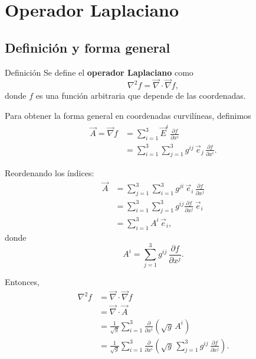 \documentclass[../apunte_mecanica_clasica.tex]{subfiles}%
\begin{document}
\section{Operador Laplaciano}


\subsection{Definición y forma general}

\begin{apuntebloque}{Definición}
Se define el \textbf{operador Laplaciano} como
\begin{equation*}
    \nabla^2 f = \vec{\nabla}\cdot \vec{\nabla} f,
\end{equation*}
donde $f$ es una función arbitraria que depende de las coordenadas.
\end{apuntebloque}

Para obtener la forma general en coordenadas curvilíneas, definimos
\begin{align*}
    \vec{A} = \vec{\nabla} f
    &= \sum_{i=1}^3 \vec{E}^i \,\frac{\partial f}{\partial x^i} \\[6pt]
    &= \sum_{i=1}^3 \sum_{j=1}^3 g^{ij}\,\vec{e}_j \,\frac{\partial f}{\partial x^i}.
\end{align*}

Reordenando los índices:
\begin{align*}
    \vec{A} 
    &= \sum_{j=1}^3 \sum_{i=1}^3 g^{ji}\,\vec{e}_i \,\frac{\partial f}{\partial x^j} \\[6pt]
    &= \sum_{i=1}^3 \sum_{j=1}^3 g^{ij} \frac{\partial f}{\partial x^j}\,\vec{e}_i \\[6pt]
    &= \sum_{i=1}^3 A^i \,\vec{e}_i,
\end{align*}
donde
\begin{equation*}
    A^i = \sum_{j=1}^3 g^{ij}\,\frac{\partial f}{\partial x^j}.
\end{equation*}

Entonces,
\begin{align*}
    \nabla^2 f 
    &= \vec{\nabla}\cdot \vec{\nabla} f \\[6pt]
    &= \vec{\nabla}\cdot \vec{A} \\[6pt]
    &= \frac{1}{\sqrt{g}} \sum_{i=1}^3 \frac{\partial}{\partial x^i} 
       \left(\sqrt{g}\, A^i\right) \\[6pt]
    &= \frac{1}{\sqrt{g}} \sum_{i=1}^3 \frac{\partial}{\partial x^i} 
       \left(\sqrt{g}\, \sum_{j=1}^3 g^{ij}\,\frac{\partial f}{\partial x^j}\right).
\end{align*}
\end{document}
